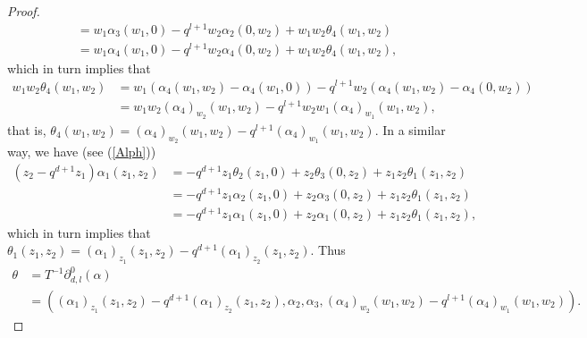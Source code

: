 \documentclass[12pt,reqno]{amsart}%
\theoremstyle{plain}
\numberwithin{theorem}{section} \numberwithin{equation}{section}
\numberwithin{lemma}{section}
\numberwithin{remark}{section}
\numberwithin{example}{section}
\numberwithin{proposition}{section}
\numberwithin{definition}{section}
\numberwithin{corollary}{section}
\begin{document}
\begin{proof}
\begin{align*}
&  =w_{1}\alpha_{3}\left(  w_{1},0\right)  -q^{l+1}w_{2}\alpha_{2}\left(
0,w_{2}\right)  +w_{1}w_{2}\theta_{4}\left(  w_{1},w_{2}\right) \\
&  =w_{1}\alpha_{4}\left(  w_{1},0\right)  -q^{l+1}w_{2}\alpha_{4}\left(
0,w_{2}\right)  +w_{1}w_{2}\theta_{4}\left(  w_{1},w_{2}\right)  ,
\end{align*}
which in turn implies that
\begin{align*}
w_{1}w_{2}\theta_{4}\left(  w_{1},w_{2}\right)   &  =w_{1}\left(  \alpha
_{4}\left(  w_{1},w_{2}\right)  -\alpha_{4}\left(  w_{1},0\right)  \right)
-q^{l+1}w_{2}\left(  \alpha_{4}\left(  w_{1},w_{2}\right)  -\alpha_{4}\left(
0,w_{2}\right)  \right) \\
&  =w_{1}w_{2}\left(  \alpha_{4}\right)  _{w_{2}}\left(  w_{1},w_{2}\right)
-q^{l+1}w_{2}w_{1}\left(  \alpha_{4}\right)  _{w_{1}}\left(  w_{1}%
,w_{2}\right)  ,
\end{align*}
that is, $\theta_{4}\left(  w_{1},w_{2}\right)  =\left(  \alpha_{4}\right)
_{w_{2}}\left(  w_{1},w_{2}\right)  -q^{l+1}\left(  \alpha_{4}\right)
_{w_{1}}\left(  w_{1},w_{2}\right)  $. In a similar way, we have (see
(\ref{Alph}))
\begin{align*}
\left(  z_{2}-q^{d+1}z_{1}\right)  \alpha_{1}\left(  z_{1},z_{2}\right)   &
=-q^{d+1}z_{1}\theta_{2}\left(  z_{1},0\right)  +z_{2}\theta_{3}\left(
0,z_{2}\right)  +z_{1}z_{2}\theta_{1}\left(  z_{1},z_{2}\right) \\
&  =-q^{d+1}z_{1}\alpha_{2}\left(  z_{1},0\right)  +z_{2}\alpha_{3}\left(
0,z_{2}\right)  +z_{1}z_{2}\theta_{1}\left(  z_{1},z_{2}\right) \\
&  =-q^{d+1}z_{1}\alpha_{1}\left(  z_{1},0\right)  +z_{2}\alpha_{1}\left(
0,z_{2}\right)  +z_{1}z_{2}\theta_{1}\left(  z_{1},z_{2}\right)  ,
\end{align*}
which in turn implies that $\theta_{1}\left(  z_{1},z_{2}\right)  =\left(
\alpha_{1}\right)  _{z_{1}}\left(  z_{1},z_{2}\right)  -q^{d+1}\left(
\alpha_{1}\right)  _{z_{2}}\left(  z_{1},z_{2}\right)  $. Thus
\begin{align*}
\theta &  =T^{-1}\partial_{d,l}^{0}\left(  \alpha\right) \\
&  =\left(  \left(  \alpha_{1}\right)  _{z_{1}}\left(  z_{1},z_{2}\right)
-q^{d+1}\left(  \alpha_{1}\right)  _{z_{2}}\left(  z_{1},z_{2}\right)
,\alpha_{2},\alpha_{3},\left(  \alpha_{4}\right)  _{w_{2}}\left(  w_{1}%
,w_{2}\right)  -q^{l+1}\left(  \alpha_{4}\right)  _{w_{1}}\left(  w_{1}%
,w_{2}\right)  \right)  .
\end{align*}

\end{proof}
\end{document}
